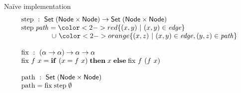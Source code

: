 \documentclass[dvipsnames]{beamer}
\newcommand\x\times
\newcommand{\ms}{\mathsf}
\newcommand{\setfor}[2]{\{#1 ~|~ #2\}}
\newcommand\kw[1]{\ensuremath{\mathbf{#1}}}
\newcommand\fname[1]{\text{#1}}
\newcommand\aname[1]{\ensuremath{\mathit{#1}}}
\begin{document}

\begin{frame}{\Large Na\"ive implementation}\large
  \[
  \begin{array}{l}
    \text{step} ~:~ \ms{Set}\; (\ms{Node} \x \ms{Node}) \to
    \ms{Set}\; (\ms{Node} \x \ms{Node})\\
    \text{step}\; \aname{path} =
    {\color<2->{red} \setfor{(x,y)}{(x,y) \in \aname{edge}}}\\
    \phantom{\text{step}\;path} \hspace{1.15pt}\cup\hspace{1.15pt}
    {\color<2->{orange} \setfor{(x,z)}{(x,y) \in \aname{edge}, (y,z) \in \aname{path}}}\\
    \\
    \text{fix} ~:~ (\alpha \to \alpha) \to \alpha \to \alpha\\
    \fname{fix}~f~x =
    \kw{if}~ (x = f~x) \mathrel{\kw{then}} x \mathrel{\kw{else}} \fname{fix}~f~(f~x)\\
    \\
    \text{path} ~:~ \ms{Set} \; (\ms{Node} \x \ms{Node})\\
    \text{path} = \text{fix} \; \text{step} \; \emptyset
  \end{array}
  \]\vspace{0em}

\end{frame}
\end{document}
